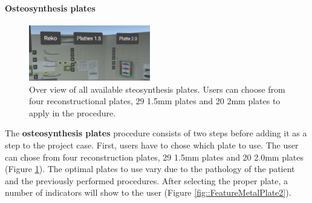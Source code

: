 \paragraph{Osteosynthesis plates}

\begin{figure}[ht]
    \centering
    \includegraphics[width=200px]{images/implementation/features/procedures/metal_plates_1.png}
    \caption{\label{fig::FeatureMetalPlate} Over view of all available steosynthesis plates. Users can choose from four reconstructional plates, 29 1.5mm plates and 20 2mm plates to apply in the procedure.}
\end{figure}

The \textbf{osteosynthesis plates} procedure consists of two steps before adding it as a step to the project case.
First, users have to chose which plate to use.
The user can chose from four reconstruction plates, 29 1.5mm plates and 20 2.0mm plates (Figure \ref{fig::FeatureMetalPlate}).
The optimal plates to use vary due to the pathology of the patient and the previously performed procedures.
After selecting the proper plate, a number of indicators will show to the user (Figure \ref{fig::FeatureMetalPlate2}).

